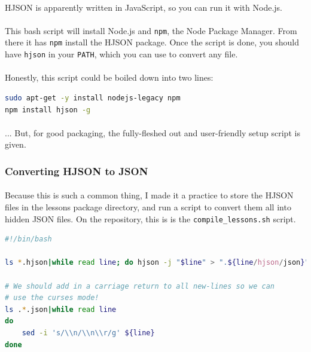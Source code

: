 \documentclass[11pt]{article}
\begin{document}
	\newpage

	\paragraph{} HJSON is apparently written in JavaScript, so you can run it with Node.js. 

	\paragraph{} This bash script will install Node.js and \texttt{npm}, the Node Package Manager. From there it has \texttt{npm} install the HJSON package. Once the script is done, you should have \texttt{hjson} in your \texttt{PATH}, which you can use to convert any file.

	\paragraph{} Honestly, this script could be boiled down into two lines:

	\begin{lstlisting}[language=Bash]
sudo apt-get -y install nodejs-legacy npm
npm install hjson -g
\end{lstlisting}

	\paragraph{} ... But, for good packaging, the fully-fleshed out and user-friendly setup script is given.

	\subsubsection{Converting HJSON to JSON}

	\paragraph{} Because this is such a common thing, I made it a practice to store the HJSON files in the lessons package directory, and run a script to convert them all into hidden JSON files. On the repository, this is is the \texttt{compile\_lessons.sh} script.

	\begin{lstlisting}[language=Bash]
#!/bin/bash

ls *.hjson|while read line; do hjson -j "$line" > ".${line/hjson/json}"; done

# We should add in a carriage return to all new-lines so we can
# use the curses mode!
ls .*.json|while read line
do
	sed -i 's/\\n/\\n\\r/g' ${line}
done
\end{lstlisting}	
\end{document}
